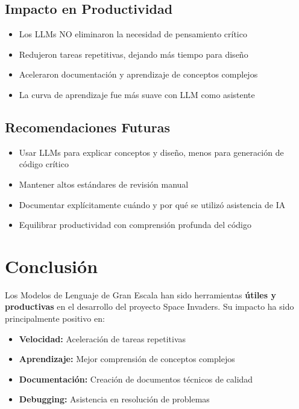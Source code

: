 \documentclass[12pt, a4paper]{article}
\begin{document}
\subsection{Impacto en Productividad}

\begin{itemize}[leftmargin=2em]
    \item Los LLMs NO eliminaron la necesidad de pensamiento crítico
    \item Redujeron tareas repetitivas, dejando más tiempo para diseño
    \item Aceleraron documentación y aprendizaje de conceptos complejos
    \item La curva de aprendizaje fue más suave con LLM como asistente
\end{itemize}

\subsection{Recomendaciones Futuras}

\begin{itemize}[leftmargin=2em]
    \item Usar LLMs para explicar conceptos y diseño, menos para generación de código crítico
    \item Mantener altos estándares de revisión manual
    \item Documentar explícitamente cuándo y por qué se utilizó asistencia de IA
    \item Equilibrar productividad con comprensión profunda del código
\end{itemize}

\section{Conclusión}

Los Modelos de Lenguaje de Gran Escala han sido herramientas \textbf{útiles y productivas} en el desarrollo del proyecto Space Invaders. Su impacto ha sido principalmente positivo en:

\begin{itemize}[leftmargin=2em]
    \item \textbf{Velocidad:} Aceleración de tareas repetitivas
    \item \textbf{Aprendizaje:} Mejor comprensión de conceptos complejos
    \item \textbf{Documentación:} Creación de documentos técnicos de calidad
    \item \textbf{Debugging:} Asistencia en resolución de problemas
\end{itemize}
\end{document}
